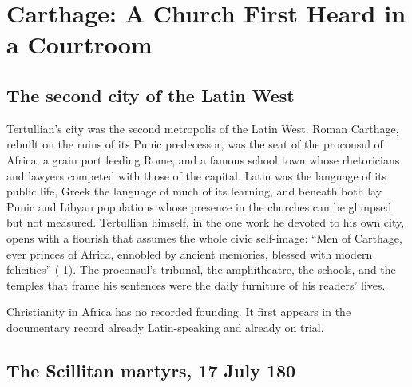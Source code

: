 \section{Carthage: A Church First Heard in a Courtroom}

\subsection{The second city of the Latin West}

Tertullian's city was the second metropolis of the Latin West. Roman Carthage,
rebuilt on the ruins of its Punic predecessor, was the seat of the proconsul of
Africa, a grain port feeding Rome, and a famous school town whose rhetoricians
and lawyers competed with those of the capital. Latin was the language of its
public life, Greek the language of much of its learning, and beneath both lay
Punic and Libyan populations whose presence in the churches can be glimpsed but
not measured. Tertullian himself, in the one work he devoted to his own city,
opens with a flourish that assumes the whole civic self-image: ``Men of
Carthage, ever princes of Africa, ennobled by ancient memories, blessed with
modern felicities'' ( 1). The proconsul's tribunal, the
amphitheatre, the schools, and the temples that frame his sentences were the
daily furniture of his readers' lives.

Christianity in Africa has no recorded founding. It first appears in the
documentary record already Latin-speaking and already on trial.


\subsection{The Scillitan martyrs, 17 July 180}

